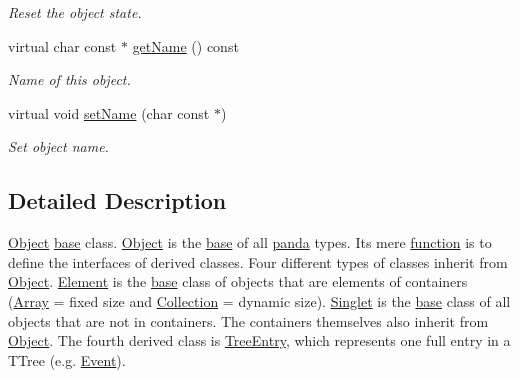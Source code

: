 \begin{DoxyCompactItemize}
\begin{DoxyCompactList}\small\item\em Reset the object state. \item\end{DoxyCompactList}\item 
virtual char const $\ast$ \hyperlink{classpanda_1_1Object_a670b2150de796b6fc742fa9de30cd6b1}{getName} () const 
\begin{DoxyCompactList}\small\item\em Name of this object. \item\end{DoxyCompactList}\item 
virtual void \hyperlink{classpanda_1_1Object_a7bba3813f78065be847cd8d85bab93fc}{setName} (char const $\ast$)
\begin{DoxyCompactList}\small\item\em Set object name. \item\end{DoxyCompactList}\end{DoxyCompactItemize}


\subsection{Detailed Description}
\hyperlink{classpanda_1_1Object}{Object} \hyperlink{namespacepanda_1_1base}{base} class. \hyperlink{classpanda_1_1Object}{Object} is the \hyperlink{namespacepanda_1_1base}{base} of all \hyperlink{namespacepanda}{panda} types. Its mere \hyperlink{namespacepanda_1_1function}{function} is to define the interfaces of derived classes. Four different types of classes inherit from \hyperlink{classpanda_1_1Object}{Object}. \hyperlink{classpanda_1_1Element}{Element} is the \hyperlink{namespacepanda_1_1base}{base} class of objects that are elements of containers (\hyperlink{classpanda_1_1Array}{Array} = fixed size and \hyperlink{classpanda_1_1Collection}{Collection} = dynamic size). \hyperlink{classpanda_1_1Singlet}{Singlet} is the \hyperlink{namespacepanda_1_1base}{base} class of all objects that are not in containers. The containers themselves also inherit from \hyperlink{classpanda_1_1Object}{Object}. The fourth derived class is \hyperlink{classpanda_1_1TreeEntry}{TreeEntry}, which represents one full entry in a TTree (e.g. \hyperlink{classpanda_1_1Event}{Event}). 

